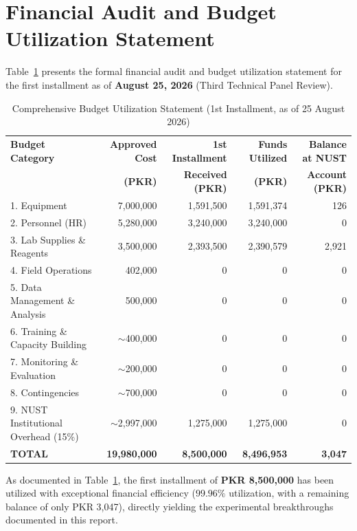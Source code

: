 \section{Financial Audit and Budget Utilization Statement}
Table~\ref{tab:budget_statement} presents the formal financial audit and budget utilization statement for the first installment as of \textbf{August 25, 2026} (Third Technical Panel Review).

\begin{table}[H]
\centering
\small
\caption{Comprehensive Budget Utilization Statement (1st Installment, as of 25 August 2026)}
\label{tab:budget_statement}
\begin{tabularx}{\textwidth}{l r r r r}
\toprule
\textbf{Budget Category} & \textbf{Approved Cost} & \textbf{1st Installment} & \textbf{Funds Utilized} & \textbf{Balance at NUST} \\
& \textbf{(PKR)} & \textbf{Received (PKR)} & \textbf{(PKR)} & \textbf{Account (PKR)} \\
\midrule
1. Equipment & 7,000,000 & 1,591,500 & 1,591,374 & 126 \\
2. Personnel (HR) & 5,280,000 & 3,240,000 & 3,240,000 & 0 \\
3. Lab Supplies \& Reagents & 3,500,000 & 2,393,500 & 2,390,579 & 2,921 \\
4. Field Operations & 402,000 & 0 & 0 & 0 \\
5. Data Management \& Analysis & 500,000 & 0 & 0 & 0 \\
6. Training \& Capacity Building & $\sim$400,000 & 0 & 0 & 0 \\
7. Monitoring \& Evaluation & $\sim$200,000 & 0 & 0 & 0 \\
8. Contingencies & $\sim$700,000 & 0 & 0 & 0 \\
9. NUST Institutional Overhead (15\%) & $\sim$2,997,000 & 1,275,000 & 1,275,000 & 0 \\
\midrule
\textbf{TOTAL} & \textbf{19,980,000} & \textbf{8,500,000} & \textbf{8,496,953} & \textbf{3,047} \\
\bottomrule
\end{tabularx}
\end{table}

As documented in Table~\ref{tab:budget_statement}, the first installment of \textbf{PKR 8,500,000} has been utilized with exceptional financial efficiency ($99.96\%$ utilization, with a remaining balance of only PKR 3,047), directly yielding the experimental breakthroughs documented in this report.

